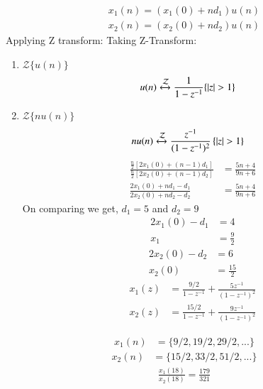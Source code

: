 \documentclass[journal,12pt,onecolumn]{IEEEtran}
\theoremstyle{remark}
\providecommand{\abs}[1]{\left\vert#1\right\vert}
\begin{document}
\begin{align}
x_1(n)=(x_1(0)+nd_1)u(n)
\label{eq:1}
\end{align}
\begin{align}
x_2(n)=(x_2(0)+nd_2)u(n)
\label{eq:2}
\end{align}
Applying Z transform:
Taking Z-Transform:
\begin{enumerate}
    \item $\mathcal{Z}\{u(n)\}$
\begin{align}
    u(n) &\xleftrightarrow{\mathcal{Z}} \frac{1}{1-z^{-1}} \{\abs{z} > 1\} \label{eq 10.5.2.11_7}
\end{align}
    \item $\mathcal{Z}\{nu(n)\}$ 
\begin{align}
    nu(n) &\xleftrightarrow{\mathcal{Z}}  \frac{z^{-1}}{(1-z^{-1})^2}\, \{\abs{z} > 1\} \label{eq 10.5.2.11_8} 
\end{align}
\begin{align}
\frac{\frac{n}{2}\left[ 2x_1(0) +(n-1)d_1 \right]}{\frac{n}{2}\left[ 2x_2(0) +(n-1)d_2 \right]}&= \frac{5n+4}{9n+6}\\
\frac{2x_1(0) +nd_1-d_1}{2x_2(0) +nd_2-d_2 }&= \frac{5n+4}{9n+6}
\end{align}
\centering
On comparing we get,
$d_1 = 5 $ and $d_2 = 9 $\\
\begin{align}
2x_1(0) - d_1 &= 4\\
x_1 &=\frac{9}{2}
\end{align}
\begin{align}
2x_2(0)- d_2&=6\\
x_2(0) &=\frac{15}{2}
\end{align}
\begin{align}
    x_1(z) &=\frac{9/2}{1-z^{-1}} + \frac{ 5z^{-1}}{(1-z^{-1})^2}\\
     x_2(z)&= \frac{15/2}{1-z^{-1}} + \frac{9z^{-1}}{(1-z^{-1})^2}
\end{align}
\end{enumerate}
\begin{align}
x_1(n)&= \lbrace 9/2,19/2,29/2,...\rbrace 
\end{align}
\begin{align}
x_2(n)&= \lbrace 15/2,33/2,51/2,...\rbrace 
\end{align}
\begin{align}
\frac{x_1(18)}{x_2(18)}=\frac{179}{321}
\end{align}
\end{document}
